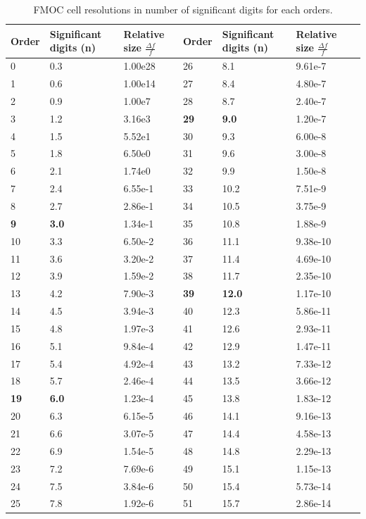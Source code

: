 \begin{table}[!htbp]
\smallskip
\begin{center}
   {\scriptsize
   \begin{tabular} {|l | l| l| l| l| l| l|}
   \hline
	   Order & Significant digits (n) & Relative size $\frac{\Delta f}{f}$ & Order & Significant digits (n) & Relative size $\frac{\Delta f}{f}$  \\
   \hline
0 & 0.3 & 1.00e28 & 26 & 8.1 & 9.61e-7 \\
1 & 0.6 & 1.00e14 & 27 & 8.4 & 4.80e-7 \\
2 & 0.9 & 1.00e7 & 28 & 8.7 & 2.40e-7 \\
3 & 1.2 & 3.16e3 & \textbf{29} & \textbf{9.0} & 1.20e-7 \\
4 & 1.5 & 5.52e1 & 30 & 9.3 & 6.00e-8 \\
5 & 1.8 & 6.50e0 & 31 & 9.6 & 3.00e-8 \\
6 & 2.1 & 1.74e0 & 32 & 9.9 & 1.50e-8 \\
7 & 2.4 & 6.55e-1 & 33 & 10.2 & 7.51e-9 \\
8 & 2.7 & 2.86e-1 & 34 & 10.5 & 3.75e-9 \\
\textbf{9} & \textbf{3.0} & 1.34e-1 & 35 & 10.8 & 1.88e-9 \\
10 & 3.3 & 6.50e-2 & 36 & 11.1 & 9.38e-10 \\
11 & 3.6 & 3.20e-2 & 37 & 11.4 & 4.69e-10 \\
12 & 3.9 & 1.59e-2 & 38 & 11.7 & 2.35e-10 \\
13 & 4.2 & 7.90e-3 & \textbf{39} & \textbf{12.0} & 1.17e-10 \\
14 & 4.5 & 3.94e-3 & 40 & 12.3 & 5.86e-11 \\
15 & 4.8 & 1.97e-3 & 41 & 12.6 & 2.93e-11 \\
16 & 5.1 & 9.84e-4 & 42 & 12.9 & 1.47e-11 \\
17 & 5.4 & 4.92e-4 & 43 & 13.2 & 7.33e-12 \\
18 & 5.7 & 2.46e-4 & 44 & 13.5 & 3.66e-12 \\
\textbf{19} & \textbf{6.0} & 1.23e-4 & 45 & 13.8 & 1.83e-12 \\
20 & 6.3 & 6.15e-5 & 46 & 14.1 & 9.16e-13 \\
21 & 6.6 & 3.07e-5 & 47 & 14.4 & 4.58e-13 \\
22 & 6.9 & 1.54e-5 & 48 & 14.8 & 2.29e-13 \\
23 & 7.2 & 7.69e-6 & 49 & 15.1 & 1.15e-13 \\
24 & 7.5 & 3.84e-6 & 50 & 15.4 & 5.73e-14 \\
25 & 7.8 & 1.92e-6 & 51 & 15.7 & 2.86e-14 \\
   \hline
   \end{tabular}
   }
\caption[FMOC order and cell resolutions in number fo significant digits]{FMOC cell resolutions in number of significant digits for each orders.}\label{table:fmocorders}
\end{center}
\end{table}

